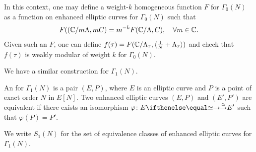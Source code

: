 In this context, one may define a weight-$k$ homogeneous function $F$ for $\Gamma_0(N)$ as a function on enhanced elliptic curves for $\Gamma_0(N)$ such that
\[
F((\mathbb{C}/m\Lambda,mC) = m^{-k}F(\mathbb{C}/\Lambda,C),\quad \forall m\in\mathbb{C}.
\]
Given such an $F$, one can define $f(\tau)=F(\mathbb{C}/\Lambda_\tau,\langle \frac 1N+\Lambda_\tau\rangle)$ and check that $f(\tau)$ is weakly modular of weight $k$ for $\Gamma_0(N)$.

We have a similar construction for $\Gamma_1(N)$.
\begin{definition}
  An  for $\Gamma_1(N)$ is a pair $(E,P)$, where $E$ is an elliptic curve
and $P$ is a point of exact order $N$ in $E[N]$. Two enhanced elliptic curves $(E,P)$ and $(E',P')$ are
equivalent if there exists an isomorphism $\varphi\colon E\tto{\simeq} E'$ such that $\varphi(P)=P'$.
\end{definition}
We write $S_1(N)$ for the set of equivalence classes of enhanced elliptic curves for $\Gamma_1(N)$.

